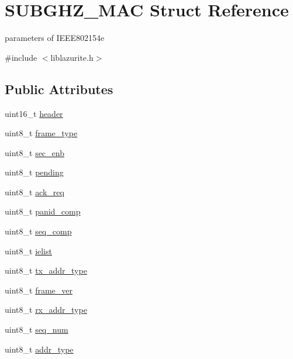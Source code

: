 \hypertarget{structSUBGHZ__MAC}{\section{S\+U\+B\+G\+H\+Z\+\_\+\+M\+A\+C Struct Reference}
\label{structSUBGHZ__MAC}
}


parameters of I\+E\+E\+E802154e  




{\ttfamily \#include $<$liblazurite.\+h$>$}

\subsection*{Public Attributes}
\begin{DoxyCompactItemize}
\item 
uint16\+\_\+t \hyperlink{structSUBGHZ__MAC_a2d57436faa7bbce52ce2eb58558f04d5}{header}
\item 
uint8\+\_\+t \hyperlink{structSUBGHZ__MAC_a8250b42914e940479b1552170ac0b231}{frame\+\_\+type}
\item 
uint8\+\_\+t \hyperlink{structSUBGHZ__MAC_a6de132110e9137708599c2aec3562b7b}{sec\+\_\+enb}
\item 
uint8\+\_\+t \hyperlink{structSUBGHZ__MAC_ae5fb71523abf317402fd145eccc6b0d2}{pending}
\item 
uint8\+\_\+t \hyperlink{structSUBGHZ__MAC_a775d5e27420a0352b1253afd211079dc}{ack\+\_\+req}
\item 
uint8\+\_\+t \hyperlink{structSUBGHZ__MAC_ab2922bd6d5517e29c69bed9b076dbecf}{panid\+\_\+comp}
\item 
uint8\+\_\+t \hyperlink{structSUBGHZ__MAC_a04a1c305bfb1962a6ad3d2da387fd83a}{seq\+\_\+comp}
\item 
uint8\+\_\+t \hyperlink{structSUBGHZ__MAC_ab792da2ce9ee262c239d3a52843b6053}{ielist}
\item 
uint8\+\_\+t \hyperlink{structSUBGHZ__MAC_ad3af27bc3e00a5359a6a042090733c82}{tx\+\_\+addr\+\_\+type}
\item 
uint8\+\_\+t \hyperlink{structSUBGHZ__MAC_a1bba4ec774ab6c7ad5b97185e5e033f6}{frame\+\_\+ver}
\item 
uint8\+\_\+t \hyperlink{structSUBGHZ__MAC_a06cf9d7509c07621b84aede7e96d4f97}{rx\+\_\+addr\+\_\+type}
\item 
uint8\+\_\+t \hyperlink{structSUBGHZ__MAC_ad684f6655aec7bb8029e1cff90480f39}{seq\+\_\+num}
\item 
uint8\+\_\+t \hyperlink{structSUBGHZ__MAC_a687f57732f46f092de4e12114740955e}{addr\+\_\+type}

\end{DoxyCompactItemize}

